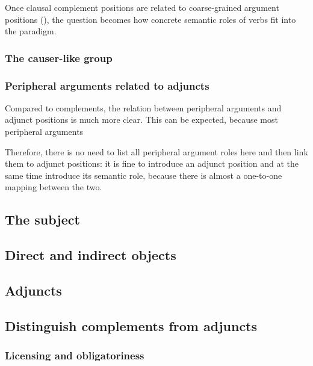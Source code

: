 \documentclass{article}
\begin{document}
Once clausal complement positions are related to coarse-grained argument positions (),
the question becomes how concrete semantic roles of verbs fit into the paradigm.

\subsubsection{The causer-like group}

\subsubsection{Peripheral arguments related to adjuncts}

Compared to complements, the relation between peripheral arguments and adjunct positions 
is much more clear. 
This can be expected, because most peripheral arguments %

Therefore, there is no need to list all peripheral argument roles here 
and then link them to adjunct positions: 
it is fine to introduce an adjunct position and at the same time introduce its semantic role,
because there is almost a one-to-one mapping between the two.

\subsection{The subject} \label{sec:subject}

\subsection{Direct and indirect objects}\label{sec:object}

\subsection{Adjuncts}\label{sec:adjuncts-classification}




\subsection{Distinguish complements from adjuncts}\label{sec:recognizing-complement-clause}

\subsubsection{Licensing and obligatoriness}
\end{document}
